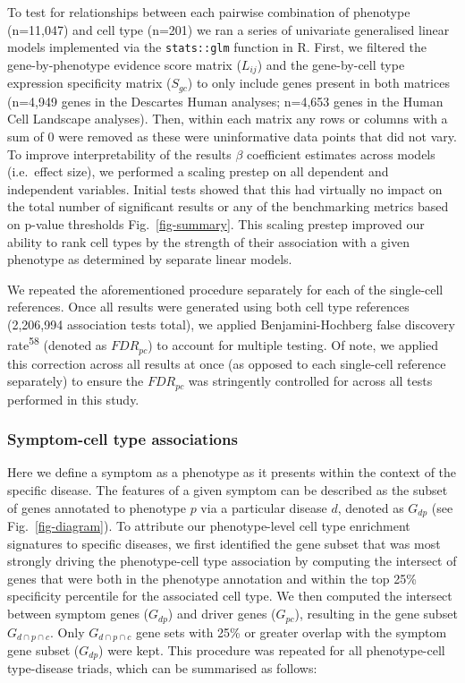 \documentclass[
]{article}
\begin{document}
To test for relationships between each pairwise combination of phenotype
(n=11,047) and cell type (n=201) we ran a series of univariate
generalised linear models implemented via the \texttt{stats::glm}
function in R. First, we filtered the gene-by-phenotype evidence score
matrix (\(L_{ij}\)) and the gene-by-cell type expression specificity
matrix (\(S_{gc}\)) to only include genes present in both matrices
(n=4,949 genes in the Descartes Human analyses; n=4,653 genes in the
Human Cell Landscape analyses). Then, within each matrix any rows or
columns with a sum of 0 were removed as these were uninformative data
points that did not vary. To improve interpretability of the results
\(\beta\) coefficient estimates across models (i.e.~effect size), we
performed a scaling prestep on all dependent and independent variables.
Initial tests showed that this had virtually no impact on the total
number of significant results or any of the benchmarking metrics based
on p-value thresholds Fig.~\ref{fig-summary}. This scaling prestep
improved our ability to rank cell types by the strength of their
association with a given phenotype as determined by separate linear
models.

We repeated the aforementioned procedure separately for each of the
single-cell references. Once all results were generated using both cell
type references (2,206,994 association tests total), we applied
Benjamini-Hochberg false discovery rate\textsuperscript{58} (denoted as
\(FDR_{pc}\)) to account for multiple testing. Of note, we applied this
correction across all results at once (as opposed to each single-cell
reference separately) to ensure the \(FDR_{pc}\) was stringently
controlled for across all tests performed in this study.

\subsubsection{Symptom-cell type
associations}\label{symptom-cell-type-associations}

Here we define a symptom as a phenotype as it presents within the
context of the specific disease. The features of a given symptom can be
described as the subset of genes annotated to phenotype \(p\) via a
particular disease \(d\), denoted as \(G_{dp}\) (see
Fig.~\ref{fig-diagram}). To attribute our phenotype-level cell type
enrichment signatures to specific diseases, we first identified the gene
subset that was most strongly driving the phenotype-cell type
association by computing the intersect of genes that were both in the
phenotype annotation and within the top 25\% specificity percentile for
the associated cell type. We then computed the intersect between symptom
genes (\(G_{dp}\)) and driver genes (\(G_{pc}\)), resulting in the gene
subset \(G_{d \cap p \cap c}\). Only \(G_{d \cap p \cap c}\) gene sets
with 25\% or greater overlap with the symptom gene subset (\(G_{dp}\))
were kept. This procedure was repeated for all phenotype-cell
type-disease triads, which can be summarised as follows:
\end{document}
